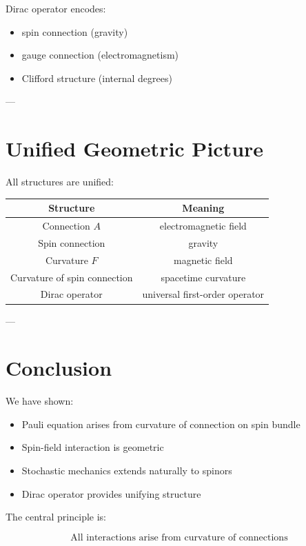 Dirac operator encodes:
\begin{itemize}
\item spin connection (gravity)
\item gauge connection (electromagnetism)
\item Clifford structure (internal degrees)
\end{itemize}

---

\section{Unified Geometric Picture}

All structures are unified:

\begin{center}
\begin{tabular}{c|c}
Structure & Meaning \\
\hline
Connection $A$ & electromagnetic field \\
Spin connection & gravity \\
Curvature $F$ & magnetic field \\
Curvature of spin connection & spacetime curvature \\
Dirac operator & universal first-order operator \\
\end{tabular}
\end{center}

---

\section{Conclusion}

We have shown:

\begin{itemize}
\item Pauli equation arises from curvature of connection on spin bundle
\item Spin-field interaction is geometric
\item Stochastic mechanics extends naturally to spinors
\item Dirac operator provides unifying structure
\end{itemize}

The central principle is:

\[
\boxed{
\text{All interactions arise from curvature of connections}
}
\]
